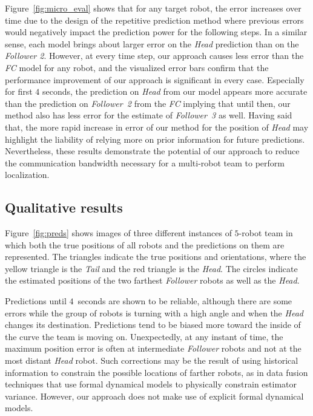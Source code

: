 \documentclass[letterpaper, 10 pt, conference]{ieeeconf}  %
\begin{document}
    Figure~\ref{fig:micro_eval} shows that for any target robot, the
    error increases over time due to the design of the repetitive
    prediction method where previous errors would negatively impact the
    prediction power for the following steps. In a similar sense, each
    model brings about larger error on the \emph{Head} prediction than
    on the \emph{Follower 2}. However, at every time step, our approach
    causes less error than the \emph{FC} model for any robot, and the
    visualized error bars confirm that the performance improvement of
    our approach is significant in every case. Especially for first $4$
    seconds, the prediction on \emph{Head} from our model appears more
    accurate than the prediction on \emph{Follower~2} from the \emph{FC}
    implying that until then, our method also has less error for the
    estimate of \emph{Follower~3} as well. Having said that, the more
    rapid increase in error of our method for the position of
    \emph{Head} may highlight the liability of relying more on prior
    information for future predictions. Nevertheless, these results
    demonstrate the potential of our approach to reduce the
    communication bandwidth necessary for a multi-robot team to perform
    localization.
        
   	\subsection{Qualitative results}
	\label{sec:qualitative_results}

    Figure~\ref{fig:preds} shows images of three different instances of
    $5$-robot team in which both the true positions of all robots and
    the predictions on them are represented. The triangles indicate the
    true positions and orientations, where the yellow triangle is the
    \emph{Tail} and the red triangle is the \emph{Head}. The circles
    indicate the estimated positions of the two farthest \emph{Follower}
    robots as well as the \emph{Head}.

    Predictions until $4$~seconds are shown to be
    reliable, although there are some errors while the group of robots
    is turning with a high angle and when the \emph{Head} changes its
    destination. Predictions tend to be biased more toward the inside of
    the curve the team is moving on. Unexpectedly, at any instant of
    time, the maximum position error is often at intermediate
    \emph{Follower} robots and not at the most distant \emph{Head}
    robot. Such corrections may be the result of using historical
    information to constrain the possible locations of farther robots,
    as in data fusion techniques that use formal dynamical models to
    physically constrain estimator variance. However, our approach does
    not make use of explicit formal dynamical models.
\end{document}
